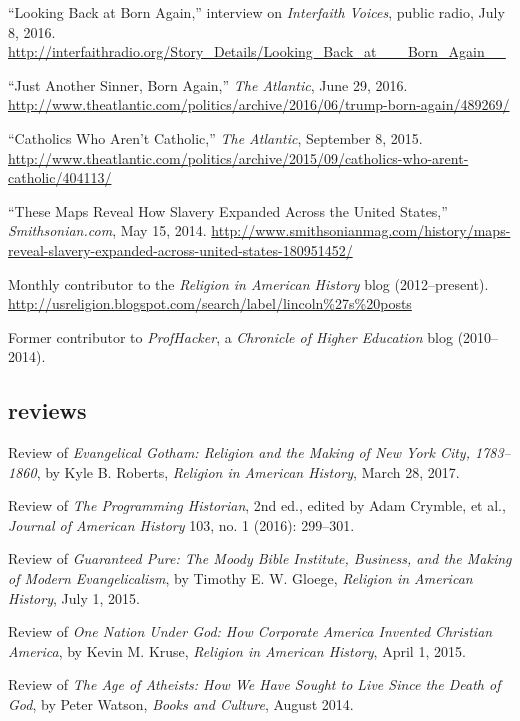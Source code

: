 \documentclass[11pt]{article}
\begin{document}
``Looking Back at Born Again,'' interview on \emph{Interfaith Voices}, public 
radio, July 8, 2016.  
\url{http://interfaithradio.org/Story_Details/Looking_Back_at___Born_Again__}

``Just Another Sinner, Born Again,'' \emph{The Atlantic}, June 29, 2016. 
\url{http://www.theatlantic.com/politics/archive/2016/06/trump-born-again/489269/}

``Catholics Who Aren't Catholic,'' \emph{The Atlantic}, September 8, 
2015.  
\url{http://www.theatlantic.com/politics/archive/2015/09/catholics-who-arent-catholic/404113/}

``These Maps Reveal How Slavery Expanded Across the United States,''
\emph{Smithsonian.com}, May 15, 2014. 
\url{http://www.smithsonianmag.com/history/maps-reveal-slavery-expanded-across-united-states-180951452/}

Monthly contributor to the \emph{Religion in American History} blog (2012--present). \url{http://usreligion.blogspot.com/search/label/lincoln\%27s\%20posts}

Former contributor to \emph{ProfHacker}, a \emph{Chronicle of Higher 
  Education} blog (2010--2014). 

\subsection{reviews}\label{book-reviews}

Review of \emph{Evangelical Gotham: Religion and the Making of New York City, 
  1783--1860}, by Kyle B. Roberts, \emph{Religion in American History}, March 
28, 2017.

Review of \emph{The Programming Historian}, 2nd ed., edited by
Adam Crymble, et al., \emph{Journal of American History} 103, no. 1 (2016): 
299--301.

Review of \emph{Guaranteed Pure: The Moody Bible Institute, Business, and the 
  Making of Modern Evangelicalism}, by Timothy E. W. Gloege, \emph{Religion in 
  American History}, July 1, 2015.

Review of \emph{One Nation Under God: How Corporate America Invented Christian 
  America}, by Kevin M. Kruse, \emph{Religion in American History}, April 1, 
2015.


Review of \emph{The Age of Atheists: How We Have Sought to Live Since
  the Death of God}, by Peter Watson, \emph{Books and Culture}, August
2014.
\end{document}
